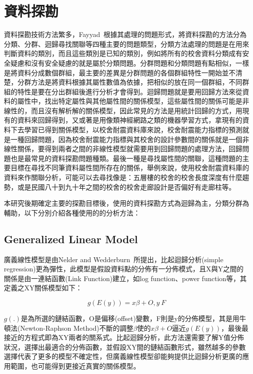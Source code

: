 \renewcommand\thetable{\arabic{chapter}-\arabic{table}}
\renewcommand{\theequation}{\arabic{chapter}-\arabic{equation}}
\chapter{資料探勘}

資料探勘技術方法繁多，Fayyad~\cite{fayyad1996data}根據其處理的問題形式，將資料探勘的方法分為分類、分群、迴歸尋找關聯等四種主要的問題類型，分類方法處理的問題是在用來判斷資料的類別，而且這些類別是已知的類別，例如將所有的校舍資料分類成有安全疑慮和沒有安全疑慮的就是屬於分類問題。分群問題和分類問題有點相似，一樣是將資料分成數個群組，最主要的差異是分群問題的各個群組特性一開始並不清楚，分群方法是將資料根據其屬性數值為依據，把相似的放在同一個群組，不同群組的特性是要在分出群組後進行分析才會得到。迴歸問題就是要用回歸方法來從資料的屬性中，找出特定屬性與其他屬性間的關係模型，這些屬性間的關係可能是非線性的，而且沒有解析解的關係模型，因此常見的方法是用統計回歸的方式，用現有的資料來回歸得到，又或著是用像類神經網路之類的機器學習方式，拿現有的資料下去學習已得到關係模型，以校舍耐震資料庫來說，校舍耐震能力指標的預測就是一種回歸問題，因為校舍耐震能力指標與其校舍的設計參數間的關係就是一個非線性關係，要得到兩者之間的非線性模型就需要用到回歸問題的處理方法，回歸問題也是最常見的資料探勘問題種類。最後一種是尋找屬性間的關聯，這種問題的主要目標在尋找不同筆資料屬性間所存在的關係，舉例來說，使用校舍耐震資料庫的資料來作關聯分析，可能可以去尋找像是：五層樓的校舍的校舍長度深度有什麼趨勢，或是民國八十到九十年之間的校舍的校舍走廊設計是否偏好有走廊柱等。

本研究後期確定主要的探勘目標後，使用的資料探勘方式為迴歸為主，分類分群為輔助，以下分別介紹各種使用的的分析方法：

\section{Generalized Linear Model}

廣義線性模型是由Nelder and Wedderburn~\cite{citeulike:5485398}所提出，比起迴歸分析(simple regression)更為彈性，此模型是假設資料點的分佈有一分佈模式，且X與Y之間的關係是由一連結函數(Link Function)建立，如log function、power function等，其定義之XY關係模型如下：

\begin{equation} g(E(y)) = x\beta + O, y~F \label{eq:GLM}\end{equation} 

$g(.)$是為所選的鏈結函數，O是偏移(offset)變數，F則是y的分佈模型，其是用牛頓法(Newton-Raphson Method)不斷的調整$\beta$使的$x\beta + O$逼近$g(E(y))$，最後最接近的方程式即為XY兩者的關系式。比起迴歸分析，此方法還需要了解Y值分佈狀況，選擇出最適合的分佈函數，並假設XY間的鏈結函數形式，雖然越多的參數選擇代表了更多的模型不確定性，但廣義線性模型卻能夠提供比迴歸分析更廣的應用範圍，也可能得到更接近真實的關係模型。

